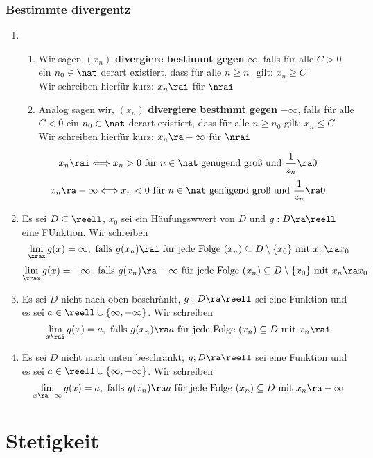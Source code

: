 \documentclass{kit}
\begin{document}
    \subsubsection{Bestimmte divergentz}
      \begin{enumerate}
        \item \begin{enumerate}[label=
oman*)]
            \item Wir sagen $(x_n)$ \textbf{divergiere bestimmt gegen} $\infty$, falls für alle $C>0$ ein $n_0\in\nat$ derart existiert, dass für alle $n\ge n_0$ gilt: $x_n\ge C$\\
              Wir schreiben hierfür kurz: $x_n\rai$ für $\nrai$
            \item Analog sagen wir, $(x_n)$ \textbf{divergiere bestimmt gegen} $-\infty$, falls für alle $C<0$ ein $n_0\in\nat$ derart existiert, dass für alle $n\ge n_0$ gilt: $x_n\le C$\\
              Wir schreiben hierfür kurz: $x_n\ra -\infty$ für $\nrai$
          \end{enumerate}
          $$x_n\rai\Longleftrightarrow x_n>0\text{ für }n\in\nat\text{ genügend groß und }\frac{1}{z_n}\ra0$$
          $$x_n\ra-\infty\Longleftrightarrow x_n<0\text{ für }n\in\nat\text{ genügend groß und }\frac{1}{z_n}\ra0$$
        \item Es sei $D\subseteq\reell$, $x_0$ sei ein Häufungswwert von $D$ und $g:D\ra\reell$ eine FUnktion. Wir schreiben
          $$\lim_\xrax g(x)=\infty,\text{ falls }g(x_n)\rai\text{ für jede Folge }(x_n)\subseteq D\setminus\{x_0\}\text{ mit }x_n\ra x_0$$
          $$\lim_\xrax g(x)=-\infty,\text{ falls }g(x_n)\ra-\infty\text{ für jede Folge }(x_n)\subseteq D\setminus\{x_0\}\text{ mit }x_n\ra x_0$$
        \item Es sei $D$ nicht nach oben beschränkt, $g:D\ra\reell$ sei eine Funktion und es sei $a\in\reell\cup\{\infty,-\infty\}$. Wir schreiben
          $$\lim_{x\rai} g(x)=a,\text{ falls }g(x_n)\ra a\text{ für jede Folge }(x_n)\subseteq D\text{ mit }x_n\rai$$
        \item Es sei $D$ nicht nach unten beschränkt, $g;D\ra\reell$ sei eine Funktion und es sei $a\in\reell\cup\{\infty,-\infty\}$. Wir schreiben
          $$\lim_{x\ra-\infty}g(x)=a,\text{ falls }g(x_n)\ra a\text{ für jede Folge }(x_n)\subseteq D\text{ mit }x_n\ra-\infty$$
      \end{enumerate}
\section{Stetigkeit}
\end{document}
